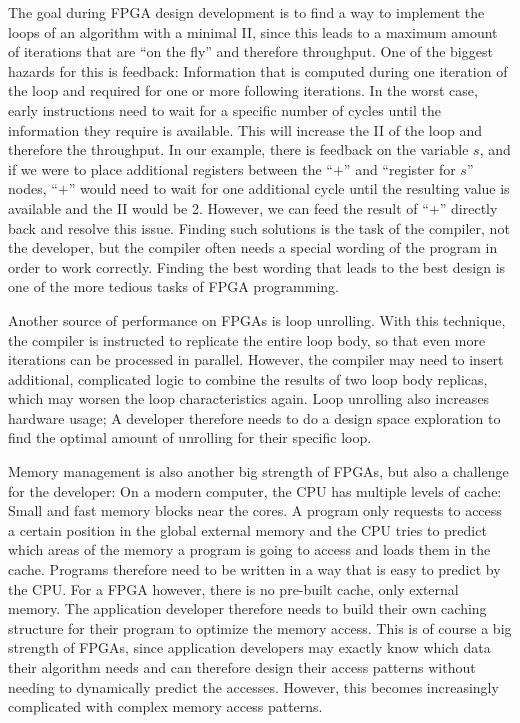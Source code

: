 The goal during \ac{FPGA} design development is to find a way to implement the loops of an algorithm with a minimal \ac{II}, since this leads to a maximum amount of iterations that are ``on the fly'' and therefore throughput. One of the biggest hazards for this is feedback: Information that is computed during one iteration of the loop and required for one or more following iterations. In the worst case, early instructions need to wait for a specific number of cycles until the information they require is available. This will increase the \ac{II} of the loop and therefore the throughput. In our example, there is feedback on the variable $s$, and if we were to place additional registers between the ``$+$'' and ``register for $s$'' nodes, ``$+$'' would need to wait for one additional cycle until the resulting value is available and the \ac{II} would be 2. However, we can feed the result of ``$+$'' directly back and resolve this issue. Finding such solutions is the task of the compiler, not the developer, but the compiler often needs a special wording of the program in order to work correctly. Finding the best wording that leads to the best design is one of the more tedious tasks of \ac{FPGA} programming.

Another source of performance on \acp{FPGA} is loop unrolling. With this technique, the compiler is instructed to replicate the entire loop body, so that even more iterations can be processed in parallel. However, the compiler may need to insert additional, complicated logic to combine the results of two loop body replicas, which may worsen the loop characteristics again. Loop unrolling also increases hardware usage; A developer therefore needs to do a design space exploration to find the optimal amount of unrolling for their specific loop.

Memory management is also another big strength of \acp{FPGA}, but also a challenge for the developer: On a modern computer, the \ac{CPU} has multiple levels of cache: Small and fast memory blocks near the cores. A program only requests to access a certain position in the global external memory and the \ac{CPU} tries to predict which areas of the memory a program is going to access and loads them in the cache. Programs therefore need to be written in a way that is easy to predict by the \ac{CPU}. For a \ac{FPGA} however, there is no pre-built cache, only external memory. The application developer therefore needs to build their own caching structure for their program to optimize the memory access. This is of course a big strength of \acp{FPGA}, since application developers may exactly know which data their algorithm needs and can therefore design their access patterns without needing to dynamically predict the accesses. However, this becomes increasingly complicated with complex memory access patterns.


